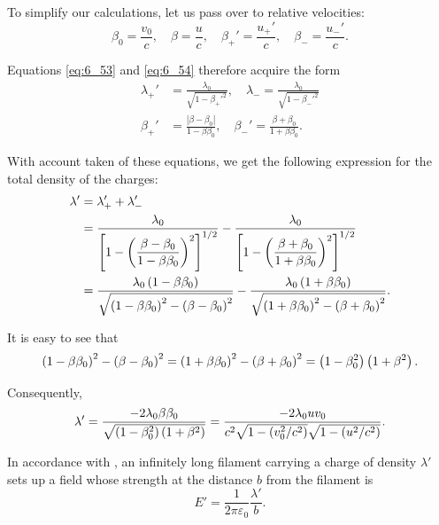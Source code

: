 To simplify our calculations, let us pass over to relative velocities:
\begin{equation*}
    \beta_0 = \frac{v_0}{c},\quad \beta = \frac{u}{c},\quad \beta_+' = \frac{u_+'}{c},\quad \beta_- = \frac{u_-'}{c}.
\end{equation*}

\noindent
Equations \eqref{eq:6_53} and \eqref{eq:6_54} therefore acquire the form
\begin{align}
    \lambda_+' &= \frac{\lambda_0}{\sqrt{1 - \beta_+'^2}},\quad \lambda_- = \frac{\lambda_0}{\sqrt{1 - \beta_-'^2}} \label{eq:6_55}\\
    \beta_+' &= \frac{|\beta - \beta_0|}{1 - \beta \beta_0},\quad \beta_-' = \frac{\beta + \beta_0}{1 + \beta \beta_0}.
\end{align}

\noindent
With account taken of these equations, we get the following expression for the total density of the charges:
\begin{align*}
    \lambda' &= \lambda_+' + \lambda_-'\\
    &= \frac{\lambda_0}{\left[ 1 - \left( \dfrac{\beta-\beta_0}{1-\beta\beta_0} \right)^2\right]^{1/2}} - \frac{\lambda_0}{\left[ 1 - \left( \dfrac{\beta+\beta_0}{1+\beta\beta_0} \right)^2\right]^{1/2}}\\
    &= \frac{\lambda_0 \left(1-\beta\beta_0\right)}{\sqrt{\left(1-\beta\beta_0\right)^2 - \left(\beta-\beta_0\right)^2}} - \frac{\lambda_0 \left(1+\beta\beta_0\right)}{\sqrt{\left(1+\beta\beta_0\right)^2 - \left(\beta+\beta_0\right)^2}}.
\end{align*}

\noindent
It is easy to see that
\begin{equation*}
    \left(1-\beta\beta_0\right)^2 - \left(\beta-\beta_0\right)^2 = \left(1+\beta\beta_0\right)^2 - \left(\beta+\beta_0\right)^2 = \left(1-\beta_0^2\right) \left(1+\beta^2\right).
\end{equation*}

\noindent
Consequently,
\begin{equation}\label{eq:6_57}
    \lambda' = \frac{-2 \lambda_0 \beta \beta_0}{\sqrt{\left(1-\beta_0^2\right) \left(1+\beta^2\right)}} = \frac{-2 \lambda_0 u v_0}{c^2 \sqrt{1 - \left(v_0^2/c^2\right)} \sqrt{1 - \left(u^2/c^2\right)}}.
\end{equation}

In accordance with , an infinitely long filament carrying a charge of density $\lambda'$ sets up a field whose strength at the distance $b$ from the filament is
\begin{equation*}
    E' = \frac{1}{2\pi\varepsilon_0} \frac{\lambda'}{b}.
\end{equation*}

